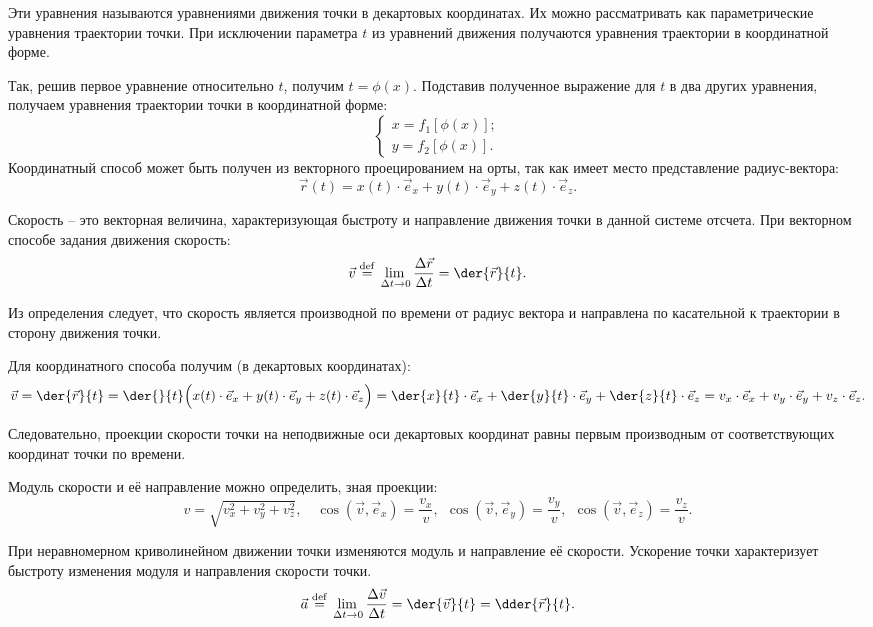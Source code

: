 Эти уравнения называются уравнениями движения точки в декартовых координатах. Их
можно рассматривать как параметрические уравнения траектории точки. При
исключении параметра \( t \) из уравнений движения получаются уравнения
траектории в координатной форме.

Так, решив первое уравнение относительно \( t \), получим \( t = \phi(x) \).
Подставив полученное выражение для \( t \) в два других уравнения, получаем
уравнения траектории точки в координатной форме:
\[ \left\{ \begin{array}{l}
    x = f_1[\phi(x)]; \\
    y = f_2[\phi(x)].
\end{array} \right. \]
Координатный способ может быть получен из векторного проецированием на орты, так
как имеет место представление радиус-вектора:
\[
    \vec{r}(t) = x(t)\cdot\vec{e}_x + y(t)\cdot\vec{e}_y + z(t)\cdot\vec{e}_z.
\]


Скорость -- это векторная величина, характеризующая быстроту и направление
движения точки в данной системе отсчета. При векторном способе задания движения
скорость:
\[
    \vec{v} \defeq \lim_{\D t \to 0} \Der{\vec{r}}{t} = \der{\vec{r}}{t}.
\]

Из определения следует, что скорость является производной по времени от радиус
вектора и направлена по касательной к траектории в сторону движения точки.

Для координатного способа получим (в декартовых координатах):
\[
    \vec{v} = \der{\vec{r}}{t} = \der{}{t}\Big(x(t)\cdot\vec{e}_x +
    y(t)\cdot\vec{e}_y + z(t)\cdot\vec{e}_z\Big) = \der{x}{t}\cdot\vec{e}_x +
    \der{y}{t}\cdot\vec{e}_y + \der{z}{t}\cdot\vec{e}_z = v_x\cdot\vec{e}_x +
    v_y\cdot\vec{e}_y + v_z\cdot\vec{e}_z.
\]

Следовательно, проекции скорости точки на неподвижные оси декартовых координат
равны первым производным от соответствующих координат точки по времени.

Модуль скорости и её направление можно определить, зная проекции:
\[
    v = \sqrt{v_x^2 + v_y^2 + v_z^2}, \quad
    \cos\left(\vec{v}, \vec{e}_x\right) = \frac{v_x}{v},\ \ 
    \cos\left(\vec{v}, \vec{e}_y\right) = \frac{v_y}{v},\ \ 
    \cos\left(\vec{v}, \vec{e}_z\right) = \frac{v_z}{v}.
\]


При неравномерном криволинейном движении точки изменяются модуль и направление
её скорости. Ускорение точки характеризует быстроту изменения модуля и
направления скорости точки.
\[
    \vec{a} \defeq \lim_{\D t \to 0} \Der{\vec{v}}{t} = \der{\vec{v}}{t} =
    \dder{\vec{r}}{t}.
\]

